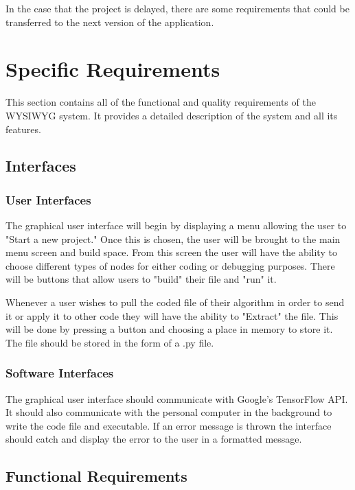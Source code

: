 \documentclass[a4paper,10pt]{article} \usepackage[margin=1.0in]{geometry} \usepackage{pdfpages} \usepackage{graphicx}
\begin{document}
In the case that the project is delayed, there are some requirements that could be transferred to the next version of the application. 

\newpage

\section{Specific Requirements}

This section contains all of the functional and quality requirements of the WYSIWYG system. 
It provides a detailed description of the system and all its features.


\subsection{Interfaces}
\subsubsection{User Interfaces}

The graphical user interface will begin by displaying a menu allowing the user to "Start a new project."
Once this is chosen, the user will be brought to the main menu screen and build space.
From this screen the user will have the ability to choose different types of nodes for either coding or debugging purposes.
There will be buttons that allow users to "build" their file and "run" it.

Whenever a user wishes to pull the coded file of their algorithm in order to send it or apply it to other code they will have the ability to "Extract" the file.
This will be done by pressing a button and choosing a place in memory to store it. 
The file should be stored in the form of a .py file.

\subsubsection{Software Interfaces}

The graphical user interface should communicate with Google's TensorFlow API.
It should also communicate with the personal computer in the background to write the code file and executable.
If an error message is thrown the interface should catch and display the error to the user in a formatted message.

\subsection{Functional Requirements}
\end{document}
